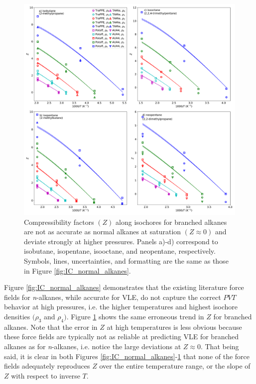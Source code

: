 \documentclass[journal=jctc,manuscript=article]{achemso}
\begin{document}
\newpage

\begin{figure}[htb!]
	\centering
	\includegraphics[width=6.4in]{IC_branched_alkanes_all_models}
	\caption{Compressibility factors $(Z)$ along isochores for branched alkanes are not as accurate as normal alkanes at saturation $(Z \approx 0)$ and deviate strongly at higher pressures. Panels a)-d) correspond to isobutane, isopentane, isooctane, and neopentane, respectively. Symbols, lines, uncertainties, and formatting are the same as those in Figure \ref{fig:IC_normal_alkanes}.}
	\label{fig:IC_branched_alkanes}
\end{figure}

\newpage



Figure \ref{fig:IC_normal_alkanes} demonstrates that the existing literature force fields for \textit{n}-alkanes, while accurate for VLE, do not capture the correct $PVT$ behavior at high pressures, i.e. the  higher temperatures and highest isochore densities $(\rho_3$ and $\rho_4)$. Figure \ref{fig:IC_branched_alkanes} shows the same erroneous trend in $Z$ for branched alkanes. Note that the error in $Z$ at high temperatures is less obvious because these force fields are typically not as reliable at predicting VLE for branched alkanes as for \textit{n}-alkanes, i.e. notice the large deviations at $Z \approx 0$. That being said, it is clear in both Figures \ref{fig:IC_normal_alkanes}-\ref{fig:IC_branched_alkanes} that none of the force fields adequately reproduces $Z$ over the entire temperature range, or the slope of $Z$ with respect to inverse $T$.
\end{document}
